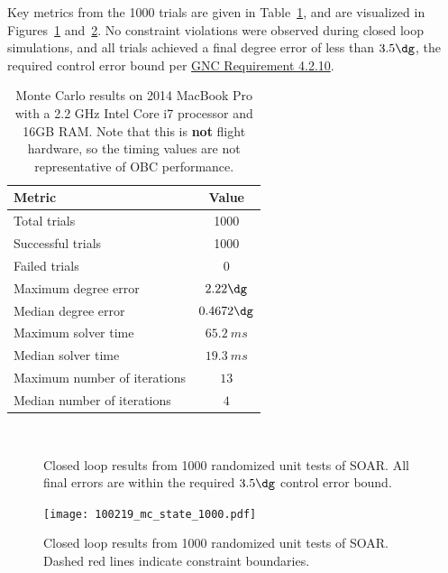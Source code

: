 \documentclass[10pt]{article}
\begin{document}
Key metrics from the 1000 trials are given in Table~\ref{tab:mc_results}, and are visualized in Figures~\ref{fig:mc_results_errs} and~\ref{fig:mc_results_state}. No constraint violations were observed during closed loop simulations, and all trials achieved a final degree error of less than $3.5\dg$, the required control error bound per \href{https://docs.google.com/document/d/1SgZlPZIc5EONQ8ZSHsm3SXJ8XMwuNXoFASMoSIeQAhw/edit#heading=h.ybip8qn9pig1}{GNC Requirement 4.2.10}.

\begin{table}
\centering
\caption{Monte Carlo results on 2014 MacBook Pro with a 2.2 GHz Intel Core i7 processor and 16GB RAM. Note that this is \textbf{not} flight hardware, so the timing values are not representative of OBC performance.}
\label{tab:mc_results}
\begin{tabular}{lc}
\textbf{Metric} & \textbf{Value} \\ \hline\hline
Total trials & 1000 \\
Successful trials & 1000 \\
Failed trials & 0 \\
Maximum degree error & $2.22\dg$\\ 
Median degree error & $0.4672\dg$ \\ 
Maximum solver time & $65.2~\unit{ms}$ \\
Median solver time & $19.3~\unit{ms}$\\
Maximum number of iterations & $13$\\
Median number of iterations & $4$
\end{tabular}
\end{table}

\begin{figure}
\centering
{}\\
\caption{Closed loop results from 1000 randomized unit tests of SOAR. All final errors are within the required $3.5\dg$ control error bound.}
\label{fig:mc_results_errs}
\end{figure}

\begin{figure}
\centering
\texttt{[image: 100219\_mc\_state\_1000.pdf]}
\caption{Closed loop results from 1000 randomized unit tests of SOAR. Dashed red lines indicate constraint boundaries.}
\label{fig:mc_results_state}
\end{figure}
\end{document}
